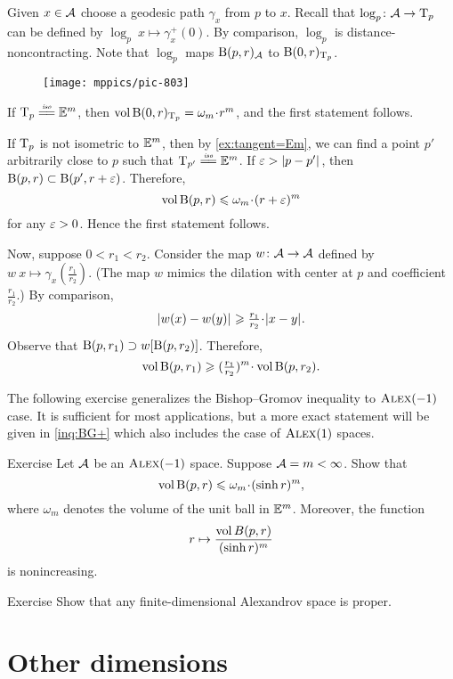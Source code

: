 Given $x\in\mathcal{A}$ choose a geodesic path $\gamma_x$ from $p$ to $x$.
Recall that $\log_p\colon\mathcal{A}\to \mathrm{T}_p$ can be defined by $\log_p\:x\mapsto \gamma_x^+(0)$.
By comparison, $\log_p$ is distance-noncontracting.
Note that $\log_p$ maps $\mathrm{B}{}(p,r)_{\mathcal{A}}$ to $\mathrm{B}{}(0,r)_{\mathrm{T}_p}$.

\begin{wrapfigure}{r}{44 mm}
\vskip-0mm
\centering
\texttt{[image: mppics/pic-803]}
\vskip1mm
\end{wrapfigure}

If $\T_p\iso \EE^m$, then $\vol\oBall(0,r)_{\T_p}\z=\omega_m\cdot r^m$,
and the first statement follows.

If $\mathrm{T}_p$ is not isometric to $\mathbb{E}^m$, then by \ref{ex:tangent=Em}, we can find a point $p'$ arbitrarily close to $p$ such that $\T_{p'}\iso \EE^m$.
If $\varepsilon>|{p}-{p'}|_{}^{{}}$, then $\mathrm{B}{}(p,r)\subset \mathrm{B}{}(p',r+\varepsilon)$.
Therefore,
\[\vol \oBall(p,r)\le \omega_m\cdot (r+\eps)^m\]
for any $\varepsilon>0$.
Hence the first statement follows.

Now, suppose $0<r_1<r_2$.
Consider the map $w\colon \mathcal{A}\to \mathcal{A}$ defined by $w\:x\mapsto \gamma_x(\tfrac {r_1}{r_2})$.
(The map $w$ mimics the dilation with center at $p$ and coefficient $\tfrac {r_1}{r_2}$.)
By comparison,
\[\dist{w(x)}{w(y)}{}\ge \tfrac {r_1}{r_2}\cdot \dist{x}{y}{}.\]
Observe that $\mathrm{B}{}(p,r_1) \supset w[\mathrm{B}{}(p,r_2)]$.
Therefore, 
\[\vol \oBall(p,r_1)\ge (\tfrac {r_1}{r_2})^m\cdot\vol \oBall(p,r_2).\]
\qedsf

The following exercise generalizes the Bishop--Gromov inequality to $\textsc{Alex}(-1)$ case. 
It is sufficient for most applications, but a more exact statement will be given in \ref{inq:BG+} which also includes the case of  $\textsc{Alex}(1)$ spaces.



\begin{thm}{Exercise}\label{ex:BG}
Let $\mathcal{A}$ be an $\textsc{Alex}(-1)$ space.
Suppose $\mathcal{A}=m<\infty$.
Show that
\[\vol \oBall(p,r)\le \omega_m\cdot(\sinh r)^m,\]
where $\omega_m$ denotes the volume of the unit ball in $\mathbb{E}^m$.
Moreover, the function 
\[r\mapsto \frac{\operatorname{\rm vol}\nolimits B(p,r)}{(\sinh r)^m}\]
is nonincreasing.
\end{thm}

\begin{thm}{Exercise}\label{ex:diam-compact:proper}
Show that any finite-dimensional Alexandrov space is proper.

\end{thm}
\section{Other dimensions}\label{sec:all-dim}


